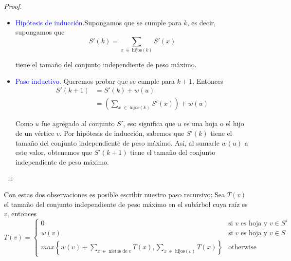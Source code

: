 \documentclass[letterpaper,11pt]{article}
\begin{document}
\begin{enumerate}
\begin{itemize}
\begin{proof}
\begin{itemize}
                \item \textcolor{blue}{Hipótesis de inducción}.Supongamos que se
                cumple para $k$, es decir, supongamos que 
                \begin{equation*}
                    S'(k) = \sum_{x \; \in \; \text{hijos}(k)} S'(x)
                \end{equation*}

                tiene el tamaño del conjunto independiente de peso máximo. 

                \item \textcolor{blue}{Paso inductivo}. Queremos probar que se 
                cumple para $k+1$. Entonces 
                \begin{align*}
                    S'(k+1)
                    &= S'(k) + w(u) \\
                    &= \left(\sum_{x \; \in \; \text{hijos}(k)} S'(x)\right) 
                    + w(u)
                \end{align*}

                Como $u$ fue agregado al conjunto $S'$, eso significa que $u$ 
                es una hoja o el hijo de un vértice $v$. Por hipótesis de 
                inducción, sabemos que $S'(k)$ tiene el tamaño del conjunto 
                independiente de 
                \newpage
                peso máximo. Así, al sumarle $w(u)$ a este 
                valor, obtenemos que $S'(k+1)$ tiene el tamaño del conjunto 
                independiente de peso máximo.
            \end{itemize}
        \end{proof}
        
    \end{itemize} 

    Con estas dos observaciones es posible escribir nuestro paso recursivo: Sea 
    $T(v)$ el tamaño del conjunto independiente de peso máximo en el subárbol 
    cuya raíz es $v$, entonces 
    \begin{equation*}
        T(v) = 
        \begin{cases}
            0 & \text{si $v$ es hoja y $v \in S'$} \\
            w(v) & \text{si $v$ es hoja y $v \in S$} \\
            max \left\{w(v) + \sum_{x \; \in \; \text{nietos de $v$}} 
            T(x), \sum_{x \; \in \; \text{hijos}(v)} T(x)\right\} 
            & \text{otherwise}
        \end{cases}
    \end{equation*}


\end{enumerate}
\end{document}
